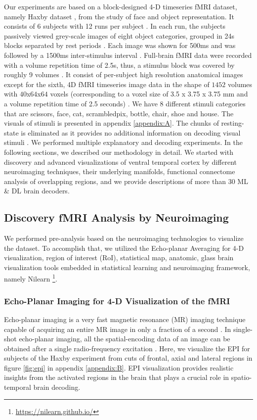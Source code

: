 \documentclass[10pt, twocolumn, letterpaper]{article}
\begin{document}
Our experiments are based on a block-designed 4-D timeseries fMRI dataset, namely Haxby dataset \cite{hansoncombinatorial, o2005partially, ds000105:00001}, from the study of face and object representation. It consists of 6 subjects with 12 runs per subject \cite{ds000105:00001}. In each run, the subjects passively viewed grey-scale images of eight object categories, grouped in 24s blocks separated by rest periods \cite{ds000105:00001,hansoncombinatorial}. Each image was shown for 500ms and was followed by a 1500ms inter-stimulus interval \cite{hansoncombinatorial}. Full-brain fMRI data were recorded with a volume repetition time of 2.5s, thus, a stimulus block was covered by roughly 9 volumes \cite{ds000105:00001}. It consist of per-subject high resolution anatomical images except for the sixth, 4D fMRI timeseries image data in the shape of $1452$ volumes with $40$x$64$x$64$ voxels (corresponding to a voxel size of 3.5 x 3.75 x 3.75 mm and a volume repetition time of 2.5 seconds) \cite{ds000105:00001}. We have 8 different stimuli categories that are scissors, face, cat, scrambledpix, bottle, chair, shoe and house. The visuals of stimuli is presented in appendix \ref{appendix:A}. The chunks of resting-state is eliminated as it provides no additional information on decoding visual stimuli \cite{ds000105:00001}.  We performed multiple explanatory and decoding experiments. In the following sections, we described our methodology in detail. We started with discovery and advanced visualizations of ventral temporal cortex by different neuroimaging techniques, their underlying manifolds, functional connectome analysis of overlapping regions, and we provide descriptions of more than 30 ML \& DL brain decoders.

\subsection{Discovery fMRI Analysis by Neuroimaging}
We performed pre-analysis based on the neuroimaging technologies to visualize the dataset. To accomplish that, we utilized the Echo-planar Averaging for 4-D visualization, region of interest (RoI), statistical map, anatomic, glass brain visualization tools embedded in statistical learning and neuroimaging framework, namely Nilearn \footnote{\url{https://nilearn.github.io/}}. 

\subsubsection{Echo-Planar Imaging for 4-D Visualization of the fMRI}
Echo-planar imaging is a very fast magnetic resonance (MR) imaging technique capable of acquiring an entire MR image in only a fraction of a second \cite{poustchi2001principles}. In single-shot echo-planar imaging, all the spatial-encoding data of an image can be obtained after a single radio-frequency excitation \cite{poustchi2001principles}. Here, we visualize the EPI for subjects of the Haxby experiment from cuts of frontal, axial and lateral regions in figure \ref{fig:epi} in appendix \ref{appendix:B}. EPI visualization provides realistic insights from the activated regions in the brain that plays a crucial role in spatio-temporal brain decoding.
\end{document}
